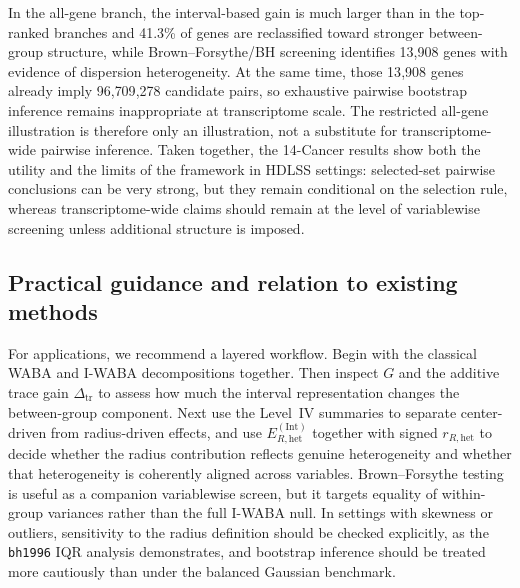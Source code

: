 \documentclass[preprint, times, 12pt, authoryear]{elsarticle}
\begin{document}
In the all-gene branch, the interval-based gain is much larger than in the top-ranked branches and 41.3\% of genes are reclassified toward stronger between-group structure, while Brown--Forsythe/BH screening identifies 13{,}908 genes with evidence of dispersion heterogeneity. At the same time, those 13{,}908 genes already imply 96{,}709{,}278 candidate pairs, so exhaustive pairwise bootstrap inference remains inappropriate at transcriptome scale. The restricted all-gene illustration is therefore only an illustration, not a substitute for transcriptome-wide pairwise inference. Taken together, the 14-Cancer results show both the utility and the limits of the framework in HDLSS settings: selected-set pairwise conclusions can be very strong, but they remain conditional on the selection rule, whereas transcriptome-wide claims should remain at the level of variablewise screening unless additional structure is imposed.

\subsection{Practical guidance and relation to existing methods}

For applications, we recommend a layered workflow. Begin with the classical WABA and I-WABA decompositions together. Then inspect $G$ and the additive trace gain $\Delta_{\mathrm{tr}}$ to assess how much the interval representation changes the between-group component. Next use the Level~IV summaries to separate center-driven from radius-driven effects, and use $E_{R,\mathrm{het}}^{(\mathrm{Int})}$ together with signed $r_{R,\mathrm{het}}$ to decide whether the radius contribution reflects genuine heterogeneity and whether that heterogeneity is coherently aligned across variables. Brown--Forsythe testing is useful as a companion variablewise screen, but it targets equality of within-group variances rather than the full I-WABA null. In settings with skewness or outliers, sensitivity to the radius definition should be checked explicitly, as the \texttt{bh1996} IQR analysis demonstrates, and bootstrap inference should be treated more cautiously than under the balanced Gaussian benchmark.
\end{document}
